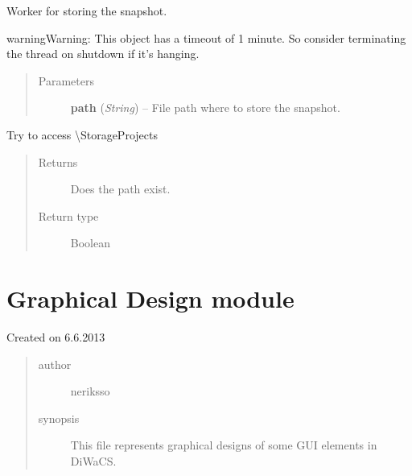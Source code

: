 \documentclass[letterpaper,10pt,english]{sphinxmanual}
\begin{document}

\begin{fulllineitems}
\label{filesystem:filesystem.snapshot_procedure}
Worker for storing the snapshot.

\begin{notice}{warning}{Warning:}
This object has a timeout of 1 minute. So consider terminating
the thread on shutdown if it's hanging.
\end{notice}
\begin{quote}\begin{description}
\item[{Parameters}] \leavevmode
\textbf{path} (\emph{String}) -- File path where to store the snapshot.

\end{description}\end{quote}

\end{fulllineitems}


\begin{fulllineitems}
\label{filesystem:filesystem.test_storage_connection}
Try to access \textbackslash{}StorageProjects
\begin{quote}\begin{description}
\item[{Returns}] \leavevmode
Does the path exist.

\item[{Return type}] \leavevmode
Boolean

\end{description}\end{quote}

\end{fulllineitems}



\section{Graphical Design module}
\label{graphicaldesign:graphical-design-module}\label{graphicaldesign::doc}\label{graphicaldesign:module-graphicaldesign}
Created on 6.6.2013
\begin{quote}\begin{description}
\item[{author}] \leavevmode
neriksso

\item[{synopsis}] \leavevmode
This file represents graphical designs of some GUI elements in DiWaCS.

\end{description}\end{quote}
\end{document}
